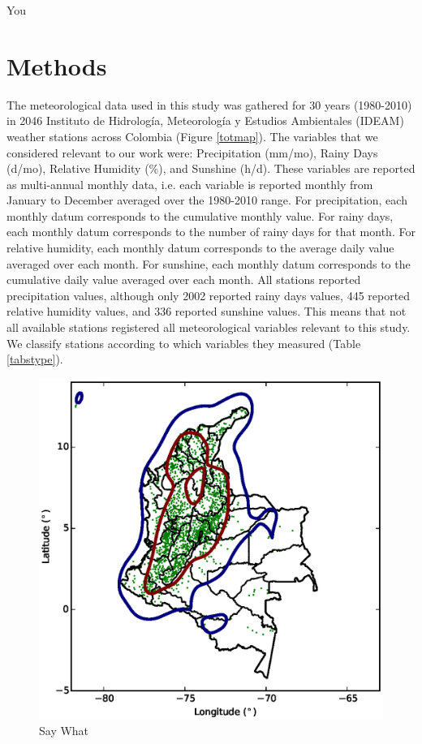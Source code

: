 \documentclass[12pt]{iopart}
\begin{document}
You \cite{embed}
  
  
\section{Methods}

The meteorological data used in this study was gathered for 30 years (1980-2010) in 2046 Instituto de Hidrolog\'ia, Meteorología y Estudios Ambientales (IDEAM) weather stations across Colombia (Figure \ref{totmap}). The  variables that we considered relevant to our work were: Precipitation (mm/mo), Rainy Days (d/mo),  Relative Humidity (\%), and Sunshine (h/d). These variables are reported as multi-annual monthly data, i.e. each variable is reported monthly from January to December averaged over the 1980-2010 range. For precipitation, each monthly datum corresponds to the cumulative monthly value.  For rainy days, each monthly datum corresponds to the number of rainy days for that month.  For relative humidity, each monthly datum corresponds to the  average daily value averaged over each month. For sunshine, each monthly datum corresponds to the cumulative daily value averaged over each month. All stations reported precipitation values, although only 2002 reported rainy days values, 445 reported relative humidity values, and 336 reported sunshine values. This means that not all available stations registered all meteorological variables relevant to this study. We classify stations according to which variables they measured (Table \ref{tabstype}).\\

\begin{figure}
\begin{center}
\includegraphics[scale=0.8]{totmap.eps}
\caption{Say What}
\end{center}
\end{figure}
\end{document}
